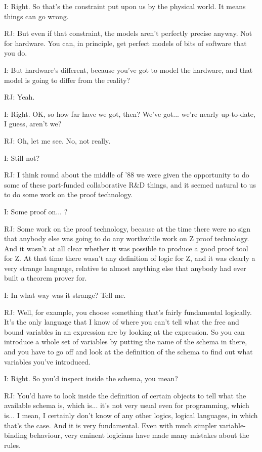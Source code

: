 \documentclass[10pt,titlepage]{book}
\begin{document}
I: Right. So that's the constraint put upon us by the physical world. It means things can go wrong.

RJ: But even if that 	constraint, the models aren't perfectly precise anyway. Not for hardware. You can, in principle, get perfect models of bits of software that you do.

I: But hardware's different, because you've got to model the hardware, and that model is going to differ from the reality?

RJ: Yeah.

I: Right. OK, so how far have we got, then? We've got... we're nearly up-to-date, I guess, aren't we?

RJ: Oh, let me see. No, not really.

I: Still not?

RJ: I think round about the middle of '88 we were given the opportunity to do some of these part-funded collaborative R\&D things, and it seemed natural to us to do some work on the proof technology.

I: Some proof on... ?

RJ: Some work on the proof technology, because at the time there were no sign that anybody else was going to do any worthwhile work on Z proof technology. And it wasn't at all clear whether it was possible to produce a good proof tool for Z. At that time there wasn't any definition of logic for Z, and it was clearly a very strange language, relative to almost anything else that anybody had ever built a theorem prover for.

I: In what way was it strange? Tell me.

RJ: Well, for example, you choose something that's fairly fundamental logically. It's the only language that I know of where you can't tell what the free and bound variables in an expression are by looking at the expression. So you can introduce a whole set of variables by putting the name of the schema in there, and you have to go off and look at the definition of the schema to find out what variables you've introduced.

I: Right. So you'd inspect inside the schema, you mean?

RJ: You'd have to look inside the definition of certain objects to tell what the available schema is, which is... it's not very usual even for programming, which is... I mean, I certainly don't know of any other logics, logical languages, in which that's the case. And it is very fundamental. Even with much simpler variable-binding behaviour, very eminent logicians have made many mistakes about the rules.
\end{document}

